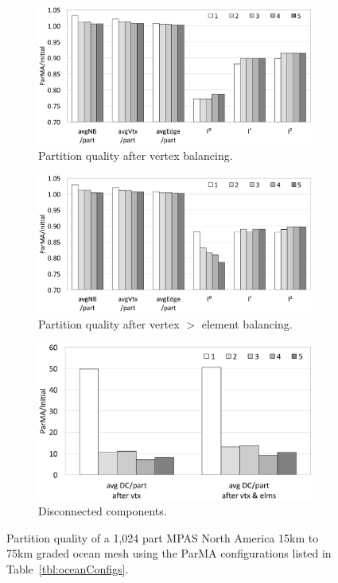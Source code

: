 \begin{figure} \centering
  \begin{subfigure}[b]{.7\textwidth}
    \includegraphics[width=\textwidth]{results/configTest/ocean/oc10_16_vtxVsInitial.eps}
    \caption{Partition quality after vertex balancing.}
    \label{fig:oc10_16vtx}
  \end{subfigure}
  \begin{subfigure}[b]{.7\textwidth}
    \includegraphics[width=\textwidth]{results/configTest/ocean/oc10_16_elmVsInitial.eps}
    \caption{Partition quality after vertex $>$ element balancing.}
    \label{fig:oc10_16vtxElm}
  \end{subfigure}
  \begin{subfigure}[b]{.75\textwidth}
    \includegraphics[width=\textwidth]{results/configTest/ocean/oc10_16_dcParts.eps}
    \caption{Disconnected components.}
    \label{fig:oc10_16dc}
  \end{subfigure}
  \caption{
    Partition quality of a 1,024 part MPAS North America 15km to 75km graded ocean mesh using
    the ParMA configurations listed in Table~\ref{tbl:oceanConfigs}.
  }
  \label{fig:oc10_16}
\end{figure}



